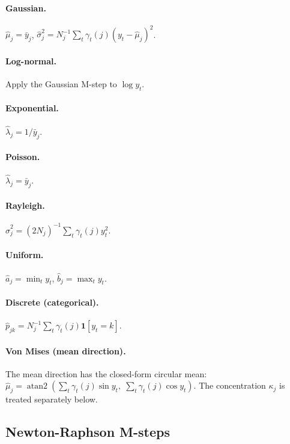 \documentclass[11pt]{article}
\begin{document}
\paragraph{Gaussian.}
$\hat{\mu}_j = \bar{y}_j$,\;
$\hat{\sigma}_j^2 = N_j^{-1} \sum_t \gamma_t(j)(y_t - \hat{\mu}_j)^2$.

\paragraph{Log-normal.}
Apply the Gaussian M-step to $\log y_t$.

\paragraph{Exponential.}
$\hat{\lambda}_j = 1 / \bar{y}_j$.

\paragraph{Poisson.}
$\hat{\lambda}_j = \bar{y}_j$.

\paragraph{Rayleigh.}
$\hat{\sigma}_j^2 = (2N_j)^{-1} \sum_t \gamma_t(j) y_t^2$.

\paragraph{Uniform.}
$\hat{a}_j = \min_t y_t$,\; $\hat{b}_j = \max_t y_t$.

\paragraph{Discrete (categorical).}
$\hat{p}_{jk} = N_j^{-1} \sum_t \gamma_t(j) \mathbf{1}[y_t = k]$.

\paragraph{Von Mises (mean direction).}
The mean direction has the closed-form circular mean:
$\hat{\mu}_j = \operatorname{atan2}\!\left(\sum_t \gamma_t(j) \sin y_t,\;
\sum_t \gamma_t(j) \cos y_t\right)$.
The concentration $\kappa_j$ is treated separately below.

\subsection{Newton-Raphson M-steps}
\label{sec:nr}
\end{document}
